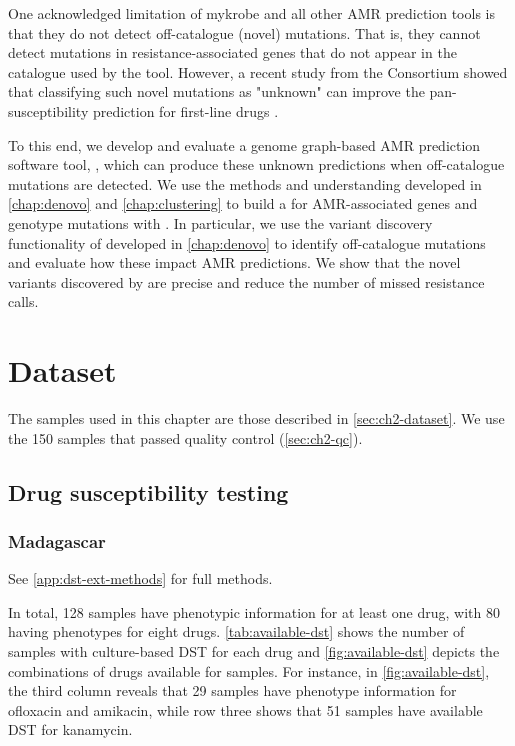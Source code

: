 One acknowledged limitation of mykrobe and all other \mtb{} AMR prediction tools is that they do not detect off-catalogue (novel) mutations. That is, they cannot detect mutations in resistance-associated genes that do not appear in the catalogue used by the tool. However, a recent study from the \cryptic{} Consortium showed that classifying such novel mutations as "unknown" can improve the pan-susceptibility prediction for first-line drugs \cite{cryptic2018}. 

To this end, we develop and evaluate a genome graph-based \mtb{} AMR prediction software tool, \drprg{}, which can produce these unknown predictions when off-catalogue mutations are detected. We use the methods and understanding developed in \autoref{chap:denovo} and \autoref{chap:clustering} to build a \mtb{} \prg{} for AMR-associated genes and genotype mutations with \pandora{}. In particular, we use the \denovo{} variant discovery functionality of \pandora{} developed in \autoref{chap:denovo} to identify off-catalogue mutations and evaluate how these impact AMR predictions. We show that the novel variants discovered by \drprg{} are precise and reduce the number of missed resistance calls.

\section{Dataset}

The \mtb{} samples used in this chapter are those described in \autoref{sec:ch2-dataset}. We use the 150 samples that passed quality control (\autoref{sec:ch2-qc}).

\subsection{Drug susceptibility testing}
\label{sec:dst-methods}


\subsubsection{Madagascar}

See \autoref{app:dst-ext-methods} for full methods.

\noindent
In total, 128 samples have phenotypic information for at least one drug, with 80 having phenotypes for eight drugs. \autoref{tab:available-dst} shows the number of samples with culture-based DST for each drug and \autoref{fig:available-dst} depicts the combinations of drugs available for samples. For instance, in \autoref{fig:available-dst}, the third column reveals that 29 samples have phenotype information for ofloxacin and amikacin, while row three shows that 51 samples have available DST for kanamycin. 

